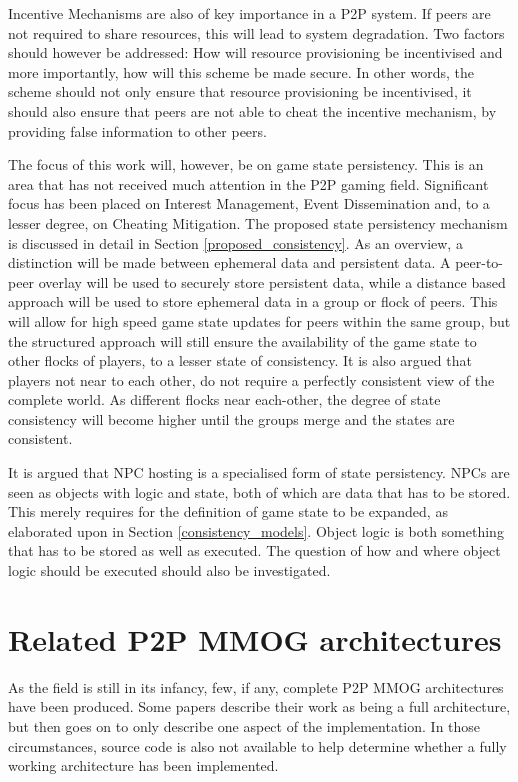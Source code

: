 \documentclass[journal,oneside,a4paper,onecolumn]{IEEEtran}
\begin{document}
Incentive Mechanisms are also of key importance in a P2P system. If peers are not required to share resources, this will lead to system degradation. Two factors should however be addressed: How will resource provisioning be incentivised and more importantly, how will this scheme be made secure. In other words, the scheme should not only ensure that resource provisioning be incentivised, it should also ensure that peers are not able to cheat the incentive mechanism, by providing false information to other peers.

The focus of this work will, however, be on game state persistency. This is an area that has not received much attention in the P2P gaming field. Significant focus has been placed on Interest Management, Event Dissemination and, to a lesser degree, on Cheating Mitigation. The proposed state persistency mechanism is discussed in detail in Section \ref{proposed_consistency}. As an overview, a distinction will be made between ephemeral data and persistent data. A peer-to-peer overlay will be used to securely store persistent data, while a distance based approach will be used to store ephemeral data in a group or flock of peers. This will allow for high speed game state updates for peers within the same group, but the structured approach will still ensure the availability of the game state to other flocks of players, to a lesser state of consistency. It is also argued that players not near to each other, do not require a perfectly consistent view of the complete world. As different flocks near each-other, the degree of state consistency will become higher until the groups merge and the states are consistent.

It is argued that NPC hosting is a specialised form of state persistency. NPCs are seen as objects with logic and state, both of which are data that has to be stored. This merely requires for the definition of game state to be expanded, as elaborated upon in Section \ref{consistency_models}. Object logic is both something that has to be stored as well as executed. The question of how and where object logic should be executed should also be investigated.

\section{Related P2P MMOG architectures}
\label{related_architectures}

As the field is still in its infancy, few, if any, complete P2P MMOG architectures have been produced. Some papers describe their work as being a full architecture, but then goes on to only describe one aspect of the implementation. In those circumstances, source code is also not available to help determine whether a fully working architecture has been implemented.
\end{document}
